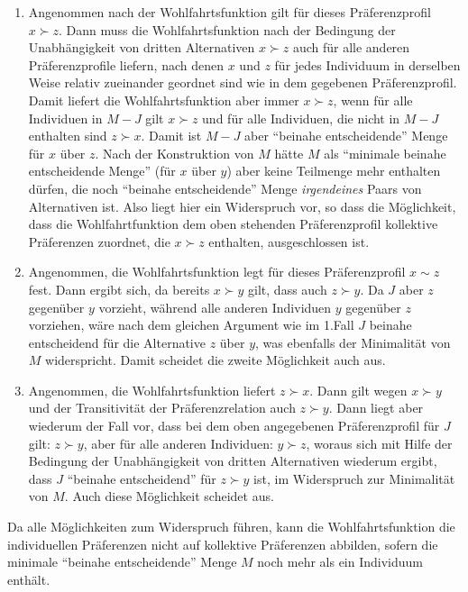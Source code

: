 \begin{enumerate}
  \item Angenommen nach der Wohlfahrtsfunktion gilt für dieses Präferenzprofil
  $x \succ z$. Dann muss die Wohlfahrtsfunktion nach der Bedingung der
  Unabhängigkeit von dritten Alternativen $x \succ z$ auch für alle
  anderen Präferenzprofile liefern, nach denen $x$ und $z$ für jedes Individuum
  in derselben Weise relativ zueinander geordnet sind wie in dem gegebenen
  Präferenzprofil. Damit liefert die Wohlfahrtsfunktion aber immer $x \succ z$,
  wenn für alle Individuen in $M-J$ gilt $x \succ z$ und für alle Individuen,
  die nicht in $M-J$ enthalten sind $z \succ x$. Damit ist $M-J$ aber "`beinahe
  entscheidende"' Menge für $x$ über $z$. Nach der Konstruktion von $M$ hätte
  $M$ als "`minimale beinahe entscheidende Menge"' (für $x$ über $y$) aber keine
  Teilmenge mehr enthalten dürfen, die noch "`beinahe entscheidende"' Menge
  {\em irgendeines} Paars von Alternativen ist. Also liegt hier ein Widerspruch
  vor, so dass die Möglichkeit, dass die Wohlfahrtfunktion dem oben stehenden
  Präferenzprofil kollektive Präferenzen zuordnet, die $x \succ z$ enthalten,
  ausgeschlossen ist.
  
  \item Angenommen, die Wohlfahrtsfunktion legt für dieses Präferenzprofil $x
  \sim z$ fest. Dann ergibt sich, da bereits $x \succ y$ gilt, dass auch $z
  \succ y$. Da $J$ aber $z$ gegenüber $y$ vorzieht, während alle anderen
  Individuen $y$ gegenüber $z$ vorziehen, wäre nach dem gleichen Argument wie
  im 1.Fall $J$ beinahe entscheidend für die Alternative $z$ über $y$, was
  ebenfalls der Minimalität von $M$ widerspricht. 
  Damit scheidet die zweite Möglichkeit auch aus.

  \item Angenommen, die Wohlfahrtsfunktion liefert $z \succ x$. Dann gilt wegen
  $x \succ y$ und der Transitivität der Präferenzrelation auch $z \succ y$.
  Dann liegt aber wiederum der Fall vor, dass bei dem oben angegebenen
  Präferenzprofil für $J$ gilt: $z \succ y$, aber für alle anderen Individuen:
  $y \succ z$, woraus sich mit Hilfe der Bedingung der Unabhängigkeit von
  dritten Alternativen wiederum ergibt, dass $J$ "`beinahe entscheidend"'
  für $z \succ y$ ist, im Widerspruch zur Minimalität von $M$. Auch diese
  Möglichkeit scheidet aus.
\end{enumerate}

Da alle Möglichkeiten zum Widerspruch führen, kann die Wohlfahrtsfunktion die
individuellen Präferenzen nicht auf kollektive Präferenzen abbilden, sofern die
minimale "`beinahe entscheidende"' Menge $M$ noch mehr als ein Individuum
enthält. 

